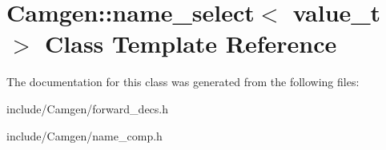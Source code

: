 \hypertarget{a00380}{\section{Camgen\-:\-:name\-\_\-select$<$ value\-\_\-t $>$ Class Template Reference}
\label{a00380}
}


The documentation for this class was generated from the following files\-:\begin{DoxyCompactItemize}
\item 
include/\-Camgen/forward\-\_\-decs.\-h\item 
include/\-Camgen/name\-\_\-comp.\-h\end{DoxyCompactItemize}
